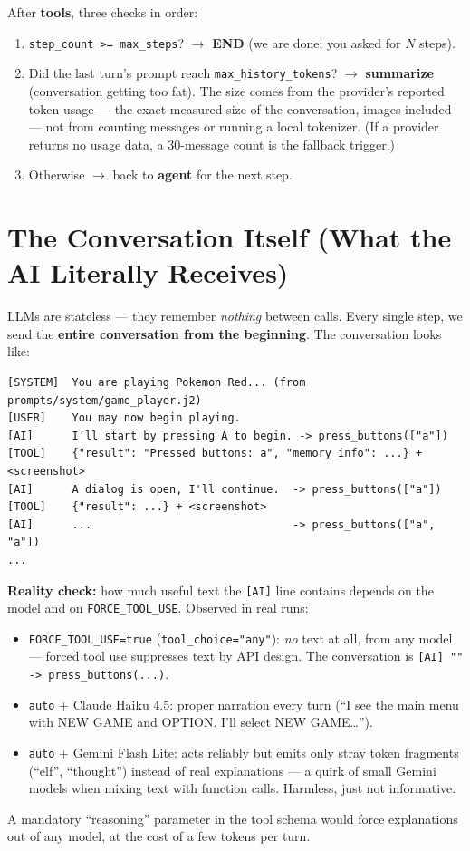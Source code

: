 \documentclass[11pt]{article}
\newcommand{\code}[1]{\texttt{#1}}
\begin{document}
After \textbf{tools}, three checks in order:
\begin{enumerate}[nosep]
  \item \code{step\_count >= max\_steps}? $\rightarrow$ \textbf{END} (we are done; you asked for $N$ steps).
  \item Did the last turn's prompt reach \code{max\_history\_tokens}? $\rightarrow$ \textbf{summarize} (conversation getting too fat). The size comes from the provider's reported token usage --- the exact measured size of the conversation, images included --- not from counting messages or running a local tokenizer. (If a provider returns no usage data, a 30-message count is the fallback trigger.)
  \item Otherwise $\rightarrow$ back to \textbf{agent} for the next step.
\end{enumerate}

\section{The Conversation Itself (What the AI Literally Receives)}
\label{sec:conversation}

LLMs are stateless --- they remember \emph{nothing} between calls. Every single step, we send the \textbf{entire conversation from the beginning}. The conversation looks like:

\begin{verbatim}
[SYSTEM]  You are playing Pokemon Red... (from prompts/system/game_player.j2)
[USER]    You may now begin playing.
[AI]      I'll start by pressing A to begin. -> press_buttons(["a"])
[TOOL]    {"result": "Pressed buttons: a", "memory_info": ...} + <screenshot>
[AI]      A dialog is open, I'll continue.  -> press_buttons(["a"])
[TOOL]    {"result": ...} + <screenshot>
[AI]      ...                               -> press_buttons(["a", "a"])
...
\end{verbatim}

\textbf{Reality check:} how much useful text the \code{[AI]} line contains depends on the model and on \code{FORCE\_TOOL\_USE}. Observed in real runs:
\begin{itemize}[nosep]
  \item \code{FORCE\_TOOL\_USE=true} (\code{tool\_choice="any"}): \emph{no} text at all, from any model --- forced tool use suppresses text by API design. The conversation is \code{[AI] "" -> press\_buttons(...)}.
  \item \code{auto} + Claude Haiku 4.5: proper narration every turn (``I see the main menu with NEW GAME and OPTION. I'll select NEW GAME\ldots'').
  \item \code{auto} + Gemini Flash Lite: acts reliably but emits only stray token fragments (``elf'', ``thought'') instead of real explanations --- a quirk of small Gemini models when mixing text with function calls. Harmless, just not informative.
\end{itemize}
A mandatory ``reasoning'' parameter in the tool schema would force explanations out of any model, at the cost of a few tokens per turn.
\end{document}
